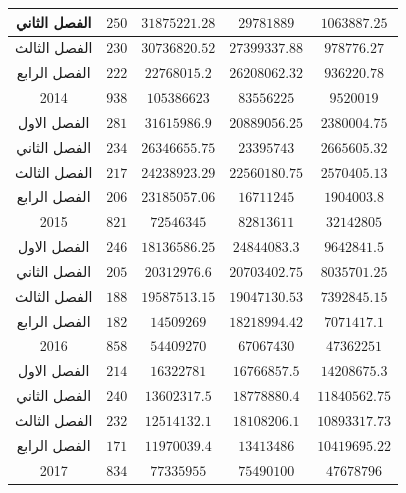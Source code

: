 \documentclass[10pt,a4paper]{report}
\begin{document}
\begin{longtable}{|c|c|c|c|c|}
الفصل الثاني & $250$            & $31875221.28$    & $29781889$     & $1063887.25$       \\ \hline
الفصل الثالث & $230$            & $30736820.52$    & $27399337.88$  & $978776.27$        \\ \hline
الفصل الرابع & $222$            & $22768015.2$     & $26208062.32$  & $936220.78$        \\ \hline
2014         & $938$            & $105386623$      & $83556225$     & $9520019$          \\ \hline
الفصل الاول  & $281$            & $31615986.9$     & $20889056.25$  & $2380004.75$       \\ \hline
الفصل الثاني & $234$            & $26346655.75$    & $23395743$     & $2665605.32$       \\ \hline
الفصل الثالث & $217$            & $24238923.29$    & $22560180.75$  & $2570405.13$       \\ \hline
الفصل الرابع & $206$            & $23185057.06$    & $16711245$     & $1904003.8$        \\ \hline
2015         & $821$            & $72546345$       & $82813611$     & $32142805$         \\ \hline
الفصل الاول  & $246$            & $18136586.25$    & $24844083.3$   & $9642841.5$        \\ \hline
الفصل الثاني & $205$            & $20312976.6$     & $20703402.75$  & $8035701.25$       \\ \hline
الفصل الثالث & $188$            & $19587513.15$    & $19047130.53$  & $7392845.15$       \\ \hline
الفصل الرابع & $182$            & $14509269$       & $18218994.42$  & $7071417.1$        \\ \hline
2016         & $858$            & $54409270$       & $67067430$     & $47362251$         \\ \hline
الفصل الاول  & $214$            & $16322781$       & $16766857.5$   & $14208675.3$       \\ \hline
الفصل الثاني & $240$            & $13602317.5$     & $18778880.4$   & $11840562.75$      \\ \hline
الفصل الثالث & $232$            & $12514132.1$     & $18108206.1$   & $10893317.73$      \\ \hline
الفصل الرابع & $171$            & $11970039.4$     & $13413486$     & $10419695.22$      \\ \hline
2017         & $834$            & $77335955$       & $75490100$     & $47678796$         \\ \hline

\end{longtable}
\end{document}
